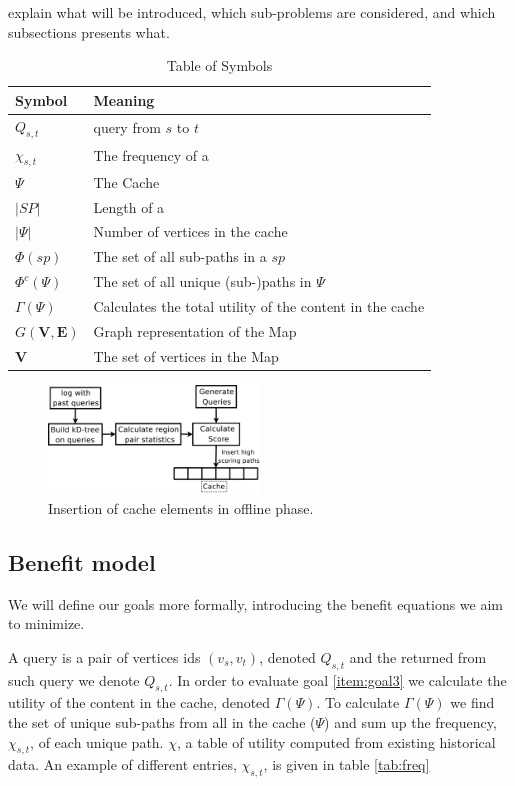 explain what will be introduced, which sub-problems are considered, and which subsections presents what.


\begin{table}
\begin{tabular*}{\columnwidth}{|l|p{}|}
\hline
\bf Symbol		& \bf Meaning \\\hline
$Q_{s,t}$		& \spath query from $s$ to $t$ \\\hline
$\chi_{s,t}$		& The frequency of a \spath \\\hline
$\Psi$ 			& The Cache \\\hline
$|SP|$			& Length of a \spath \\\hline
$|\Psi|$		& Number of vertices in the cache \\\hline
$\Phi(sp)$		& The set of all sub-paths in a \spath $sp$ \\\hline
$\Phi^c(\Psi)$		& The set of all unique (sub-)paths in $\Psi$ \\\hline
$\Gamma(\Psi)$		& Calculates the total utility of the content in the cache \\\hline 
$G\mathbf{(V,E)}$ 	& Graph representation of the Map \\\hline 
$\mathbf{V}$ 		& The set of vertices in the Map \\\hline 
\end{tabular*}
\caption{Table of Symbols}
\label{tab:symbols}
\end{table}


\begin{figure}[bht]
  \center
        \includegraphics[width=0.5\textwidth]{figures/fillcache}
        \caption{Insertion of cache elements in offline phase.}
  \label{fig:fillcache}
\end{figure}


\subsection{Benefit model}

We will define our goals more formally, introducing the benefit equations we aim to minimize.

A query is a pair of vertices ids $(v_s, v_t)$, denoted $Q_{s,t}$ and the \spath returned from such query we denote $Q_{s,t}$. 
In order to evaluate goal \ref{item:goal3} we calculate the utility of the content in the cache, denoted $\Gamma(\Psi)$. To calculate $\Gamma(\Psi)$ we find the set of unique sub-paths from all \spaths in the cache ($\Psi$) and sum up the frequency, $\chi_{s,t}$, of each unique path.
$\chi$, a table of utility computed from existing historical data. An example of different entries, $\chi_{s,t}$, is given in table \ref{tab:freq}

